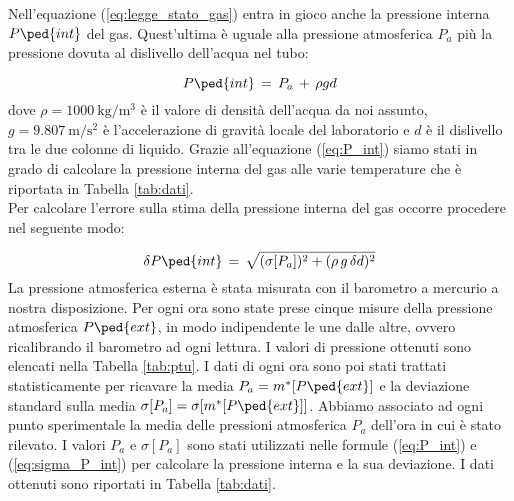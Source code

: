 %

Nell'equazione (\ref{eq:legge_stato_gas}) entra in gioco anche la pressione interna $P\ped{int}$ del gas. Quest'ultima è uguale alla pressione atmosferica $P_a$ più la pressione dovuta al dislivello dell'acqua nel tubo:

\begin{equation}
	P\ped{int} \,=\, P_a \,+\, \rho  g  d
	\label{eq:P_int}
\end{equation}
%
dove $\rho = \SI{1000}{\kilo\gram\per\cubic\metre}$ è il valore di densità dell'acqua da noi assunto, $g = \SI{9.807}{\meter\per\square\second}$ è l'accelerazione di gravità locale del laboratorio e $d$ è il dislivello tra le due colonne di liquido. Grazie all'equazione (\ref{eq:P_int}) siamo stati in grado di calcolare la pressione interna del gas alle varie temperature che è riportata in Tabella \ref{tab:dati}.\\
Per calcolare l'errore sulla stima della pressione interna del gas occorre procedere nel seguente modo:

\begin{equation}
	\delta P\ped{int} \,=\, \sqrt{(\sigma [P_a])^2 + (\rho\,g\,\delta d)^2}
	\label{eq:sigma_P_int}
\end{equation}
%
La pressione atmosferica esterna è stata misurata con il barometro a mercurio a nostra disposizione. Per ogni ora sono state prese cinque misure della pressione atmosferica $P\ped{ext}$, in modo indipendente le une dalle altre, ovvero ricalibrando il barometro ad ogni lettura. I valori di pressione ottenuti sono elencati nella Tabella \ref{tab:ptu}. I dati di ogni ora sono poi stati trattati statisticamente per ricavare la media $P_a = m^*[P\ped{ext}]$ e la deviazione standard sulla media $\sigma [P_a] = \sigma[m^*[P\ped{ext}]]$. Abbiamo associato ad ogni punto sperimentale la media delle pressioni atmosferica $P_a$ dell'ora in cui è stato rilevato. I valori $P_a$ e $\sigma[P_a]$ sono stati utilizzati nelle formule (\ref{eq:P_int}) e (\ref{eq:sigma_P_int}) per calcolare la pressione
interna e la sua deviazione. I dati ottenuti sono riportati in Tabella \ref{tab:dati}.



